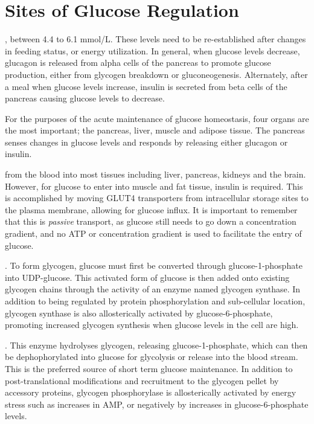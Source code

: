 \documentclass{tufte-handout}
\begin{document}
\section{Sites of Glucose Regulation}

, between 4.4 to 6.1 mmol/L.  These levels need to be re-established after changes in feeding status, or energy utilization.  In general, when glucose levels decrease, glucagon is released from alpha cells of the pancreas to promote glucose production, either from glycogen breakdown or gluconeogenesis.  Alternately, after a meal when glucose levels increase, insulin is secreted from beta cells of the pancreas causing glucose levels to decrease.

For the purposes of the acute maintenance of glucose homeostasis, four organs are the most important; the pancreas, liver, muscle and adipose tissue.  The pancreas senses changes in glucose levels and responds by releasing either glucagon or insulin. 

 from the blood into most tissues including liver, pancreas, kidneys and the brain.  However, for glucose to enter into muscle and fat tissue, insulin is required.  This is accomplished by moving GLUT4 transporters from intracellular storage sites to the plasma membrane, allowing for glucose influx.  It is important to remember that this is \emph{passive} transport, as glucose still needs to go down a concentration gradient, and no ATP or concentration gradient is used to facilitate the entry of glucose.

.  To form glycogen, glucose must first be converted through glucose-1-phosphate into UDP-glucose.  This activated form of glucose is then added onto existing glycogen chains through the activity of an enzyme named glycogen synthase.  In addition to being regulated by protein phosphorylation and sub-cellular location, glycogen synthase is also allosterically activated by glucose-6-phosphate, promoting increased glycogen synthesis when glucose levels in the cell are high.

.  This enzyme hydrolyses glycogen, releasing glucose-1-phosphate, which can then be dephophorylated into glucose for glycolysis or release into the blood stream.  This is the preferred source of short term glucose maintenance.  In addition to post-translational modifications and recruitment to the glycogen pellet by accessory proteins, glycogen phosphorylase is allosterically activated by energy stress such as increases in AMP, or negatively by increases in glucose-6-phosphate levels.
\end{document}
